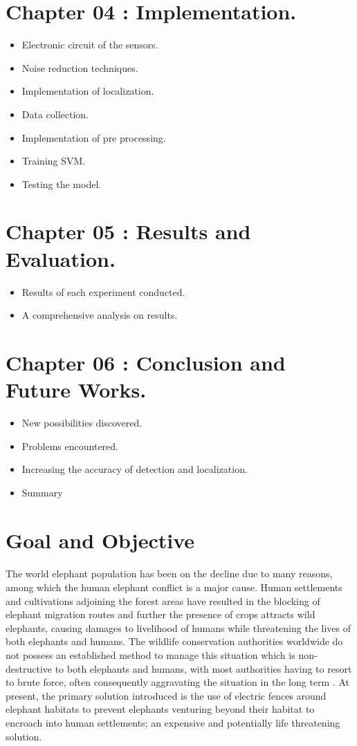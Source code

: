 \documentclass[11pt]{article}
\numberwithin{figure}{section}
\numberwithin{table}{section}
\begin{document}
\section*{Chapter 04 : Implementation.}
\begin{itemize}
  \item Electronic circuit of the sensors.
  \item Noise reduction techniques.
  \item Implementation of localization.
  \item Data collection.
  \item Implementation of pre processing.
  \item Training SVM.
  \item Testing the model.
\end{itemize}
\section*{Chapter 05 : Results and Evaluation.}
\begin{itemize}
  \item Results of each experiment conducted.
  \item A comprehensive analysis on results.
\end{itemize}
\section*{Chapter 06 : Conclusion and Future Works.}
\begin{itemize}
  \item New possibilities discovered.
  \item Problems encountered.
  \item Increasing the accuracy of detection and localization.
  \item Summary
\end{itemize}
\newpage

\section{Goal and Objective}
\paragraph{}
The world elephant population has been on the decline \cite {13} due to many reasons, among which the human elephant conflict is a major cause. Human settlements and cultivations adjoining the forest areas have resulted in the blocking of elephant migration routes and further  the presence of crops attracts wild elephants, causing damages to livelihood of humans while threatening the lives of both elephants and humans. The wildlife conservation authorities worldwide do not possess an established method to manage this situation which is non-destructive to both elephants and humans, with most authorities having to resort to brute force, often consequently aggravating the situation in the long term \cite {13}. At present, the primary solution introduced is the use of electric fences around elephant habitats to prevent elephants venturing beyond their habitat to encroach into human settlements; an expensive and potentially life threatening solution. 
\end{document}
